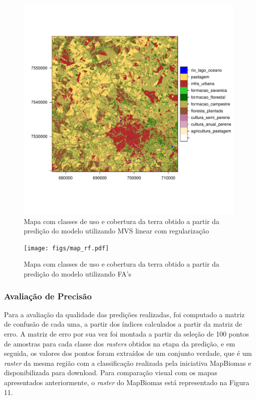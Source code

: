\begin{figure}[H]
    \centering
    \caption{Mapa com classes de uso e cobertura da terra obtido a partir da predição do modelo utilizando MVS linear com regularização} 
    \includegraphics[scale=0.8]{figs/map_svm-linear.pdf}
\end{figure}
\begin{figure}[H]
    \centering
    \caption{Mapa com classes de uso e cobertura da terra obtido a partir da predição do modelo utilizando FA's} 
    \texttt{[image: figs/map\_rf.pdf]}
\end{figure}

\subsubsection{Avaliação de
Precisão}\label{avaliacao-de-precisao}

Para a avaliação da qualidade das predições realizadas, foi computado
a matriz de confusão de cada uma, a partir dos índices calculados a
partir da matriz de erro. A matriz de erro por sua vez foi montada a
partir da seleção de 100 pontos de amostras para cada classe dos
\emph{rasters} obtidos na etapa da predição, e em seguida, os valores
dos pontos foram extraídos de um conjunto verdade, que é um
\emph{raster} da mesma região com a classificação realizada pela
iniciativa MapBiomas e disponibilizada para download. Para comparação
visual com os mapas apresentados anteriormente, o \emph{raster} do
MapBiomas está representado na Figura 11.

